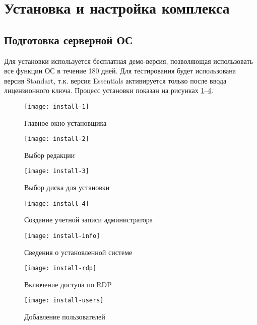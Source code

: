 \section{Установка и настройка комплекса}

\subsection{Подготовка серверной ОС}

Для установки используется бесплатная демо-версия, позволяющая использовать все функции
ОС в течение 180 дней. Для тестирования будет использована версия Standart, т.к.
версия Essentials активируется только после ввода лицензионного ключа. Процесс установки
показан на рисунках \ref{pic:install-1}–\ref{pic:install-4}.

\begin{figure}[p]
    \center
    \texttt{[image: install-1]}
    \caption{Главное окно установщика}
    \label{pic:install-1}
\end{figure}

\begin{figure}[p]
    \center
    \texttt{[image: install-2]}
    \caption{Выбор редакции}
    \label{pic:install-2}
\end{figure}

\begin{figure}[p]
    \center
    \texttt{[image: install-3]}
    \caption{Выбор диска для установки}
    \label{pic:install-3}
\end{figure}

\begin{figure}[p]
    \center
    \texttt{[image: install-4]}
    \caption{Создание учетной записи администратора}
    \label{pic:install-4}
\end{figure}

\begin{figure}[p]
    \center
    \texttt{[image: install-info]}
    \caption{Сведения о установленной системе}
    \label{pic:install-info}
\end{figure}

\begin{figure}[p]
    \center
    \texttt{[image: install-rdp]}
    \caption{Включение доступа по RDP}
    \label{pic:install-rdp}
\end{figure}

\begin{figure}[h]
    \center
    \texttt{[image: install-users]}
    \caption{Добавление пользователей}
    \label{pic:install-users}
\end{figure}

